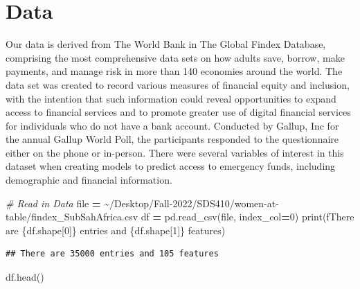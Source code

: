 \documentclass[water,article,submit,moreauthors,pdftex]{mdpi}
\newenvironment{Shaded}{\begin{snugshade}}{\end{snugshade}}
\newcommand{\BuiltInTok}[1]{#1}
\newcommand{\CommentTok}[1]{\textcolor[rgb]{0.56,0.35,0.01}{\textit{#1}}}
\newcommand{\DecValTok}[1]{\textcolor[rgb]{0.00,0.00,0.81}{#1}}
\newcommand{\NormalTok}[1]{#1}
\newcommand{\OperatorTok}[1]{\textcolor[rgb]{0.81,0.36,0.00}{\textbf{#1}}}
\newcommand{\SpecialCharTok}[1]{\textcolor[rgb]{0.00,0.00,0.00}{#1}}
\newcommand{\SpecialStringTok}[1]{\textcolor[rgb]{0.31,0.60,0.02}{#1}}
\newcommand{\StringTok}[1]{\textcolor[rgb]{0.31,0.60,0.02}{#1}}
\begin{document}
\hypertarget{data}{%
\section{Data}\label{data}}

Our data is derived from The World Bank in The Global Findex Database,
comprising the most comprehensive data sets on how adults save, borrow,
make payments, and manage risk in more than 140 economies around the
world. The data set was created to record various measures of financial
equity and inclusion, with the intention that such information could
reveal opportunities to expand access to financial services and to
promote greater use of digital financial services for individuals who do
not have a bank account. Conducted by Gallup, Inc for the annual Gallup
World Poll, the participants responded to the questionnaire either on
the phone or in-person. There were several variables of interest in this
dataset when creating models to predict access to emergency funds,
including demographic and financial information.

\begin{Shaded}
\begin{Highlighting}[]
\CommentTok{\# Read in Data}
\BuiltInTok{file} \OperatorTok{=} \StringTok{\textquotesingle{}\textasciitilde{}/Desktop/Fall{-}2022/SDS410/women{-}at{-}table/findex\_SubSahAfrica.csv\textquotesingle{}}
\NormalTok{df }\OperatorTok{=}\NormalTok{ pd.read\_csv(}\BuiltInTok{file}\NormalTok{, index\_col}\OperatorTok{=}\DecValTok{0}\NormalTok{)}
\BuiltInTok{print}\NormalTok{(}\SpecialStringTok{f\textquotesingle{}There are }\SpecialCharTok{\{}\NormalTok{df}\SpecialCharTok{.}\NormalTok{shape[}\DecValTok{0}\NormalTok{]}\SpecialCharTok{\}}\SpecialStringTok{ entries and }\SpecialCharTok{\{}\NormalTok{df}\SpecialCharTok{.}\NormalTok{shape[}\DecValTok{1}\NormalTok{]}\SpecialCharTok{\}}\SpecialStringTok{ features\textquotesingle{}}\NormalTok{)}
\end{Highlighting}
\end{Shaded}

\begin{verbatim}
## There are 35000 entries and 105 features
\end{verbatim}

\begin{Shaded}
\begin{Highlighting}[]
\NormalTok{df.head()}
\end{Highlighting}
\end{Shaded}
\end{document}
